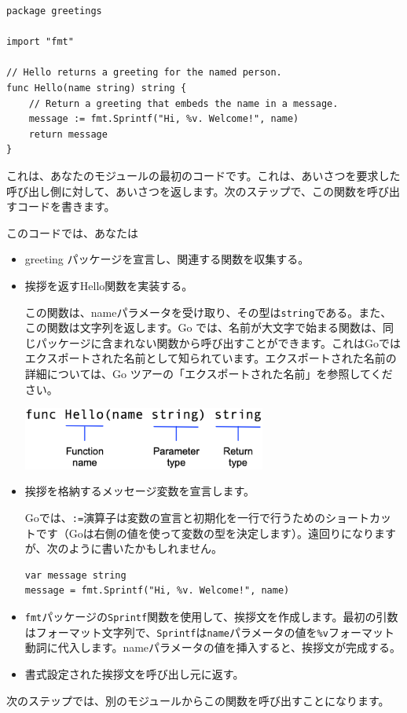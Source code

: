 \begin{enumerate}
\begin{lstlisting}[numbers=none]
package greetings

import "fmt"

// Hello returns a greeting for the named person.
func Hello(name string) string {
    // Return a greeting that embeds the name in a message.
    message := fmt.Sprintf("Hi, %v. Welcome!", name)
    return message
}
\end{lstlisting}

これは、あなたのモジュールの最初のコードです。これは、あいさつを要求した呼び出し側に対して、あいさつを返します。次のステップで、この関数を呼び出すコードを書きます。

このコードでは、あなたは
\begin{itemize}
\item greeting パッケージを宣言し、関連する関数を収集する。
\item 挨拶を返すHello関数を実装する。

この関数は、nameパラメータを受け取り、その型は\texttt{string}である。また、この関数は文字列を返します。Go では、名前が大文字で始まる関数は、同じパッケージに含まれない関数から呼び出すことができます。これはGoではエクスポートされた名前として知られています。エクスポートされた名前の詳細については、Go ツアーの「エクスポートされた名前」を参照してください。

\includegraphics[width=8cm]{function-syntax.eps}

\item 挨拶を格納するメッセージ変数を宣言します。

Goでは、\texttt{:=}演算子は変数の宣言と初期化を一行で行うためのショートカットです（Goは右側の値を使って変数の型を決定します）。遠回りになりますが、次のように書いたかもしれません。

\begin{lstlisting}[numbers=none]
var message string
message = fmt.Sprintf("Hi, %v. Welcome!", name)
\end{lstlisting}

\item \texttt{fmt}パッケージの\texttt{Sprintf}関数を使用して、挨拶文を作成します。最初の引数はフォーマット文字列で、\texttt{Sprintf}は\texttt{name}パラメータの値を\texttt{\%v}フォーマット動詞に代入します。nameパラメータの値を挿入すると、挨拶文が完成する。

\item 書式設定された挨拶文を呼び出し元に返す。

\end{itemize}
\end{enumerate}


次のステップでは、別のモジュールからこの関数を呼び出すことになります。